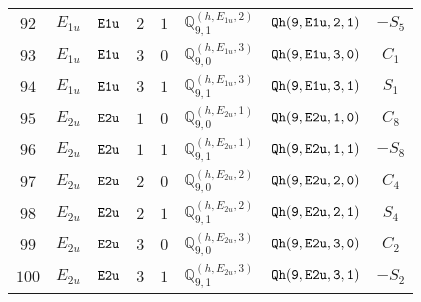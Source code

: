 \documentclass[fleqn,8pt]{jsarticle}
\begin{document}
\begin{table}[ht!]
\begin{center}
\begin{tabular}{cccccccc}
$ 92 $ & $ E_{1u} $ & $ {\tt E1u} $ & $ 2 $ & $ 1 $ & $ \mathbb{Q}_{9,1}^{(h,E_{1u},2)} $ & $ {\tt Qh(9,E1u,2,1)} $ & $ - S_{5} $ \\
$ 93 $ & $ E_{1u} $ & $ {\tt E1u} $ & $ 3 $ & $ 0 $ & $ \mathbb{Q}_{9,0}^{(h,E_{1u},3)} $ & $ {\tt Qh(9,E1u,3,0)} $ & $ C_{1} $ \\
$ 94 $ & $ E_{1u} $ & $ {\tt E1u} $ & $ 3 $ & $ 1 $ & $ \mathbb{Q}_{9,1}^{(h,E_{1u},3)} $ & $ {\tt Qh(9,E1u,3,1)} $ & $ S_{1} $ \\
$ 95 $ & $ E_{2u} $ & $ {\tt E2u} $ & $ 1 $ & $ 0 $ & $ \mathbb{Q}_{9,0}^{(h,E_{2u},1)} $ & $ {\tt Qh(9,E2u,1,0)} $ & $ C_{8} $ \\
$ 96 $ & $ E_{2u} $ & $ {\tt E2u} $ & $ 1 $ & $ 1 $ & $ \mathbb{Q}_{9,1}^{(h,E_{2u},1)} $ & $ {\tt Qh(9,E2u,1,1)} $ & $ - S_{8} $ \\
$ 97 $ & $ E_{2u} $ & $ {\tt E2u} $ & $ 2 $ & $ 0 $ & $ \mathbb{Q}_{9,0}^{(h,E_{2u},2)} $ & $ {\tt Qh(9,E2u,2,0)} $ & $ C_{4} $ \\
$ 98 $ & $ E_{2u} $ & $ {\tt E2u} $ & $ 2 $ & $ 1 $ & $ \mathbb{Q}_{9,1}^{(h,E_{2u},2)} $ & $ {\tt Qh(9,E2u,2,1)} $ & $ S_{4} $ \\
$ 99 $ & $ E_{2u} $ & $ {\tt E2u} $ & $ 3 $ & $ 0 $ & $ \mathbb{Q}_{9,0}^{(h,E_{2u},3)} $ & $ {\tt Qh(9,E2u,3,0)} $ & $ C_{2} $ \\
$ 100 $ & $ E_{2u} $ & $ {\tt E2u} $ & $ 3 $ & $ 1 $ & $ \mathbb{Q}_{9,1}^{(h,E_{2u},3)} $ & $ {\tt Qh(9,E2u,3,1)} $ & $ - S_{2} $ \\
 \hline \hline
\end{tabular}
\end{center}
\end{table}
\end{document}
